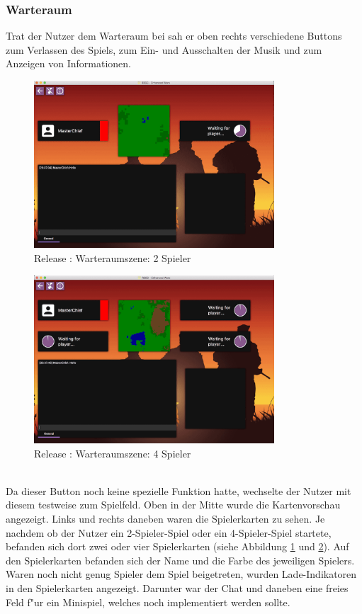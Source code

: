 \documentclass[12pt, titlepage]{scrartcl}
\newcommand{\RN}[1]{%
	\textup{\uppercase\expandafter{\romannumeral#1}}%
}
\begin{document}
	        \subsubsection{Warteraum} \label{WAITING_ROOM}
                Trat der Nutzer dem Warteraum bei sah er oben rechts verschiedene Buttons zum Verlassen des Spiels, zum Ein- und Ausschalten der Musik und zum Anzeigen von Informationen. \\
                \begin{figure}[H] 
    				\centering
    				\includegraphics[width=0.8\textwidth]{images/old_state/waiting_room/2Player.png}
    				\caption{Release \RN{2}: Warteraumszene: 2 Spieler}
    				\label{Waiting_Room_2}
			    \end{figure}
			    \begin{figure}[H] 
    				\centering
    				\includegraphics[width=0.8\textwidth]{images/old_state/waiting_room/4Player.png}
    				\caption{Release \RN{2}: Warteraumszene: 4 Spieler}
    				\label{Waiting_Room_4}
			    \end{figure}
			    \ \\  Da dieser Button noch keine spezielle Funktion hatte, wechselte der Nutzer mit diesem testweise zum Spielfeld. Oben in der Mitte wurde die Kartenvorschau angezeigt.  Links und rechts daneben waren die Spielerkarten zu sehen. Je nachdem ob der Nutzer ein 2-Spieler-Spiel oder ein 4-Spieler-Spiel startete, befanden sich dort zwei oder vier Spielerkarten (siehe Abbildung \ref{Waiting_Room_2} und \ref{Waiting_Room_4}). Auf den Spielerkarten befanden sich der Name und die Farbe des jeweiligen Spielers. Waren noch nicht genug Spieler dem Spiel beigetreten, wurden Lade-Indikatoren in den Spielerkarten angezeigt. Darunter war der Chat und daneben eine freies Feld f"ur ein Minispiel, welches noch implementiert werden sollte.
\end{document}
